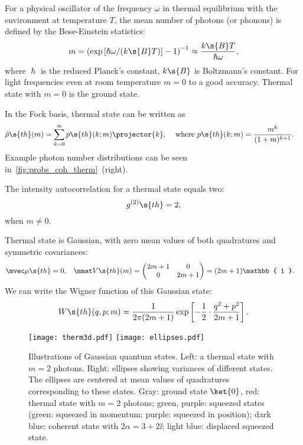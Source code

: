 \documentclass[fontsize=9pt]{scrartcl}
\renewcommand{\hbar}{\hslash}
\begin{document}
For a physical oscillator of the frequency $\omega$ in thermal equilibrium with the environment at temperature $T$, the mean number of photons (or phonons) is defined by the Bose-Einstein statistics:
\begin{equation}
  m = \left( \exp\left[ \hbar \omega / ( k\s{B} T )\right] - 1 \right)^{-1}
  \approx \frac{ k\s{B} T }{ \hbar \omega },
\end{equation}
where $\hbar$ is the reduced Planck's constant, $k\s{B}$ is Boltzmann's constant.
For light frequencies even at room temperature $m = 0$ to a good accuracy.
Thermal state with $m=0$ is the ground state.

In the Fock basis, thermal state can be written as
\begin{align}
  \hat \rho\s{th} (m) & = \sum_{k = 0 }^\infty p\s{th} (k; m) \projector{k},
  &
  \text{ where }
  p\s{th} ( k; m) & = \frac{ m^k }{ ( 1  + m )^{k + 1 } }.
\end{align}
Example photon number distributions can be seen in~\cref{fig:probs_coh_therm}~(right).

The intensity autocorrelation for a thermal state equals two:
\begin{equation}
  g^{(2)}\s{th} = 2,
\end{equation}
when $m \neq 0$.

Thermal state is Gaussian, with zero mean values of both quadratures and symmetric covariances:
\begin{align}
  \mvec \mu\s{th} & = 0,
  &
  \mmat V\s{th} (m) & =
  \begin{pmatrix}
    2 m + 1 & 0 \\ 0 & 2 m + 1
  \end{pmatrix}
  = ( 2 m + 1 ) \mathbb{ 1 }.
\end{align}
We can write the Wigner function of this Gaussian state:
\begin{equation}
  W\s{th} (q ,p; m ) =
  \frac{ 1 }{ 2 \pi ( 2 m + 1 ) }
  \exp\left[ - \frac{ 1 }{ 2 }\cdot \frac{ q^2 + p^2 }{ 2 m + 1 } \right].
\end{equation}

\begin{figure}[htb]
  \centering
  \texttt{[image: therm3d.pdf]}
  \texttt{[image: ellipses.pdf]}
  \caption{Illustrations of Gaussian quantum states.
    Left: a thermal state with $m = 2$ photons.
    Right: ellipses showing variances of different states.
    The ellipses are centered at mean values of quadratures corresponding to these states.
  Gray: ground state $\ket{0}$, red: thermal state with $m = 2$ photons; green, purple: squeezed states (green: squeezed in momentum; purple: squeezed in position); dark blue: coherent state with $2 \alpha = 3 + 2 \ii$; light blue: displaced squeezed state. }
  \label{fig:gaussian_plots}
\end{figure}
\end{document}
